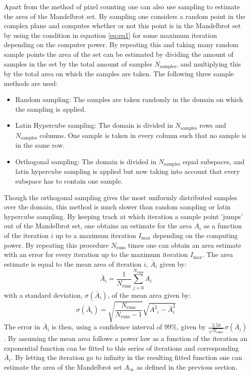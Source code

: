 \documentclass[10pt,a4paper]{article}
\begin{document}
\noindent Apart from the method of pixel counting one can also use sampling to estimate the area of the Mandelbrot set. By sampling one considers a random point in the complex plane and computes whether or not this point is in the Mandelbrot set by using the condition in equation \ref{eq:eq1} for some maximum iteration depending on the computer power. By repeating this and taking many random sample points the area of the set can be estimated by dividing the amount of samples in the set by the total amount of samples $N_{\text{samples}}$, and multiplying this by the total area on which the samples are taken. The following three sample methods are used:\\
\begin{itemize}
  \item
    Random sampling: The samples are taken randomly in the domain on which the sampling is applied.
  \item
    Latin Hypercube sampling: The domain is divided in $N_{\text{samples}}$ rows and $N_{\text{samples}}$ columns. One sample is taken in every column such that no sample is in the same row.
  \item
    Orthogonal sampling: The domain is divided in $N_{\text{samples}}$ equal subspaces, and latin hypercube sampling is applied but now taking into account that every subspace has to contain one sample.
\end{itemize}
\noindent Though the orthogonal sampling gives the most uniformly distributed samples over the domain, this method is much slower than random sampling or latin hypercube sampling.
\newline
\noindent By keeping track at which iteration a sample point 'jumps' out of the Mandelbrot set, one obtains an estimate for the area $A_{i}$ as a function of the iteration $i$ up to a maximum iteration $I_{\text{max}}$ depending on the computing power. By repeating this procedure $N_{\text{runs}}$ times one can obtain an area estimate with an error for every iteration up to the maximum iteration $I_{\text{max}}$. The area estimate is equal to the mean area of iteration $i$, $\bar{A}_{i}$ given by:
\begin{equation}
\bar{A}_{i} = \frac{1}{N_{\text{runs}}} \sum_{j=0}^{N_{\text{runs}}} A_{i}
\end{equation}
with a standard deviation, $\sigma(\bar{A}_{i})$, of the mean area given by:
\begin{equation}
\sigma(\bar{A}_{i}) = \sqrt{\frac{N_{\text{runs}}}{N_{\text{runs}}-1}} \sqrt{\overline{A^{2}}_{i} - \bar{A}_{i}^{2}}
\end{equation}
\noindent The error in $\bar{A}_{i}$ is then, using a confidence interval of 99$\%$, given by $\frac{2.58}{\sqrt{N_{\text{runs}}}} \sigma(\bar{A}_{i})$ \cite{paper2}. By assuming the mean area follows a power law as a function of the iteration an exponential function can be fitted to this series of iterations and corresponding $\bar{A}_{i}$. By letting the iteration go to infinity in the resulting fitted function one can estimate the area of the Mandelbrot set $A_{\infty}$ as defined in the previous section. 
\end{document}
